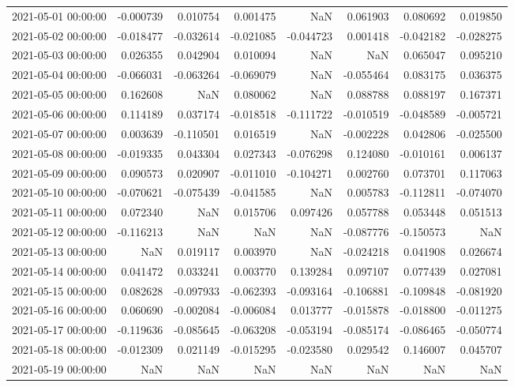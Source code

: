 \begin{tabular}{lrrrrrrr}
2021-05-01 00:00:00 & -0.000739 & 0.010754 & 0.001475 & NaN & 0.061903 & 0.080692 & 0.019850 \\
2021-05-02 00:00:00 & -0.018477 & -0.032614 & -0.021085 & -0.044723 & 0.001418 & -0.042182 & -0.028275 \\
2021-05-03 00:00:00 & 0.026355 & 0.042904 & 0.010094 & NaN & NaN & 0.065047 & 0.095210 \\
2021-05-04 00:00:00 & -0.066031 & -0.063264 & -0.069079 & NaN & -0.055464 & 0.083175 & 0.036375 \\
2021-05-05 00:00:00 & 0.162608 & NaN & 0.080062 & NaN & 0.088788 & 0.088197 & 0.167371 \\
2021-05-06 00:00:00 & 0.114189 & 0.037174 & -0.018518 & -0.111722 & -0.010519 & -0.048589 & -0.005721 \\
2021-05-07 00:00:00 & 0.003639 & -0.110501 & 0.016519 & NaN & -0.002228 & 0.042806 & -0.025500 \\
2021-05-08 00:00:00 & -0.019335 & 0.043304 & 0.027343 & -0.076298 & 0.124080 & -0.010161 & 0.006137 \\
2021-05-09 00:00:00 & 0.090573 & 0.020907 & -0.011010 & -0.104271 & 0.002760 & 0.073701 & 0.117063 \\
2021-05-10 00:00:00 & -0.070621 & -0.075439 & -0.041585 & NaN & 0.005783 & -0.112811 & -0.074070 \\
2021-05-11 00:00:00 & 0.072340 & NaN & 0.015706 & 0.097426 & 0.057788 & 0.053448 & 0.051513 \\
2021-05-12 00:00:00 & -0.116213 & NaN & NaN & NaN & -0.087776 & -0.150573 & NaN \\
2021-05-13 00:00:00 & NaN & 0.019117 & 0.003970 & NaN & -0.024218 & 0.041908 & 0.026674 \\
2021-05-14 00:00:00 & 0.041472 & 0.033241 & 0.003770 & 0.139284 & 0.097107 & 0.077439 & 0.027081 \\
2021-05-15 00:00:00 & 0.082628 & -0.097933 & -0.062393 & -0.093164 & -0.106881 & -0.109848 & -0.081920 \\
2021-05-16 00:00:00 & 0.060690 & -0.002084 & -0.006084 & 0.013777 & -0.015878 & -0.018800 & -0.011275 \\
2021-05-17 00:00:00 & -0.119636 & -0.085645 & -0.063208 & -0.053194 & -0.085174 & -0.086465 & -0.050774 \\
2021-05-18 00:00:00 & -0.012309 & 0.021149 & -0.015295 & -0.023580 & 0.029542 & 0.146007 & 0.045707 \\
2021-05-19 00:00:00 & NaN & NaN & NaN & NaN & NaN & NaN & NaN \\

\end{tabular}
